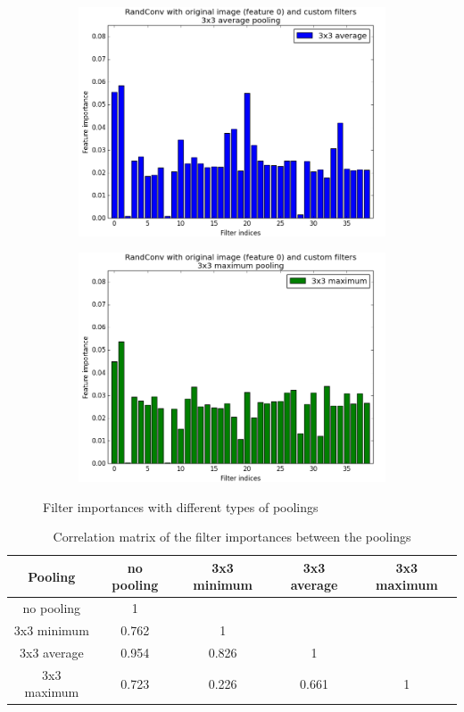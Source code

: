 \documentclass[a4paper]{report}
\begin{document}
\begin{figure}
\begin{subfigure}{.5\textwidth}
			\includegraphics[width=1.\linewidth]{images/FIPoolAvg.png}
			\caption{\label{fig:FIPoolAvg}}
		\end{subfigure}%
		\begin{subfigure}{.5\textwidth}
			\centering
			\includegraphics[width=1.\linewidth]{images/FIPoolMax.png}
			\caption{\label{fig:FIPoolMax}}
		\end{subfigure}
		\caption{\label{fig:FIPool}Filter importances with different types of poolings}
	\end{figure}
	
	
	\begin{table}
		\centering
			\begin{tabular}{|c||c|c|c|c|}
			\hline
			Pooling & no pooling & 3x3 minimum & 3x3 average & 3x3 maximum\\
			\hline \hline 
			no pooling & 1 & & &  \\
			\hline
			3x3 minimum & 0.762 & 1 & & \\
			\hline
			3x3 average & 0.954 & 0.826 & 1 & \\
			\hline
			3x3 maximum & 0.723 & 0.226 & 0.661 & 1 \\
			\hline
			\end{tabular}
		\caption{\label{tab:FIPoolCorr}Correlation matrix of the filter importances between the poolings}
	\end{table}
	
\end{document}

